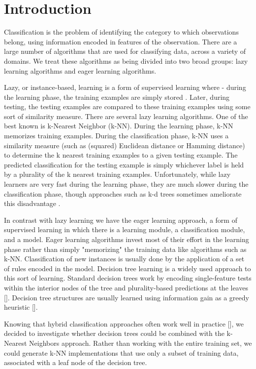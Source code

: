 \section{Introduction}
Classification is the problem of identifying the category to which observations belong, using information encoded in features of the observation. There are a large number of algorithms that are used for classifying data, across a variety of domains.  We treat these algorithms as being divided into two broad groups: lazy learning algorithms and eager learning algorithms.

  Lazy, or instance-based, learning is a form of supervised learning where - during the learning phase, the training examples are simply stored \cite{FathiMazinani}.  Later, during testing, the testing examples are compared to these training examples using some sort of similarity measure.  There are several lazy learning algorithms. One of the best known is k-Nearest Neighbor (k-NN). During the learning phase, k-NN memorizes training examples. During the classification phase, k-NN uses a similarity measure (such as (squared) Euclidean distance or Hamming distance) to determine the k nearest training examples to a given testing example.  The predicted classification for the testing example is simply whichever label is held by a plurality of the k nearest training examples.  Unfortunately, while lazy learners are very fast during the learning phase, they are much slower during the classification phase, though approaches such as k-d trees sometimes ameliorate this disadvantage \cite{Wettschereck}\cite{Sun}.

   In contrast with lazy learning we have the eager learning approach, a form of supervised learning in which there is a learning module, a classification module, and a model. Eager learning algorithms invest most of their effort in the learning phase rather than simply "memorizing" the training data like algorithms such as k-NN. Classification of new instances is usually done by the application of a set of rules encoded in the model. Decision tree learning is a widely used approach to this sort of learning. Standard decision trees work by encoding single-feature tests within the interior nodes of the tree and plurality-based predictions at the leaves [].  Decision tree structures are usually learned using information gain as a greedy heuristic [].

  Knowing that hybrid classification approaches often work well in practice [], we decided to investigate whether decision trees could be combined with the k-Nearest Neighbors approach.  Rather than working with the entire training set, we could generate k-NN implementations that use only a subset of training data, associated with a leaf node of the decision tree.

